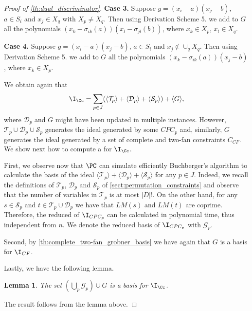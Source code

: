 \documentclass[11pt]{article}
\newtheorem{lemma}[theorem]{Lemma}
\begin{document}
\begin{proof} [Proof of \cref{th:dual_discriminator}]
\textbf{Case 3.} Suppose $ g = (x_i - a)(x_j - b)$, $a \in S_i$ and $x_j \in X_q$ with $X_p \neq X_q$. Then using Derivation Scheme 5. we add to $G$ all the polynomials $(x_k - \sigma_{ik}(a))(x_l - \sigma_{jl}(b))$, where $x_k \in X_p$, $x_l \in X_q$.

\textbf{Case 4.} Suppose $g = (x_i - a)(x_j - b)$, $a \in S_i$ and $x_j \notin \cup_q X_q$. Then using Derivation Scheme 5. we add to $G$ all the polynomials $(x_k - \sigma_{ik}(a))(x_j - b)$, where $x_k \in X_p$.

We obtain again that
\begin{equation}\label{eqn:combinatorial_ideal_decomposition_2}
    \I_{\Cc} = \sum_{p \in J} (\langle \mathcal{T}_p \rangle + \langle \mathcal{D}_p \rangle + \langle \mathcal{S}_p \rangle) + \langle G \rangle,
\end{equation}
where $\mathcal{D}_p$ and $G$ might have been updated in multiple instances. However, $\mathcal{T}_p \cup \mathcal{D}_p \cup \mathcal{S}_p$ generates the ideal generated by some $CPC_p$ and, similarly, $G$ generates the ideal generated by a set of complete and two-fan constraints $C_{CF}$. We show next how to compute a \GB for $\I_\Cc$.

First, we observe now that $\PC$ can simulate efficiently Buchberger's algorithm to calculate the \GB basis of the ideal $\langle \mathcal{T}_p \rangle + \langle \mathcal{D}_p \rangle + \langle \mathcal{S}_p \rangle$ for any $p \in J$. Indeed, we recall the definitions of $\mathcal{T}_p$, $\mathcal{D}_p$ and $\mathcal{S}_p$ of \cref{sect:permutation_constraints} and observe that the number of variables in $\mathcal{T}_p$ is at most $|D|!$. On the other hand, for any $s \in \mathcal{S}_p$ and $t \in \mathcal{T}_p \cup \mathcal{D}_p$ we have that $LM(s)$ and $LM(t)$ are coprime. Therefore, the reduced \GB  of $\I_{CPC_p}$ can be calculated in polynomial time, thus independent from $n$. We denote the reduced \GB basis of $\I_{CPC_p}$ with $\mathcal{G}_p$.

Second, by \cref{th:complete_two-fan_grobner_basis} we have again that $G$ is a \GB basis for $\I_{CF}$.

Lastly, we have the following lemma.

\begin{lemma}\cite{BharathiM21, BharathiM25}
    The set $\left( \bigcup_p \mathcal{G}_p \right) \cup G$ is a \GB basis for $\I_\Cc$.
\end{lemma}

The result follows from the lemma above.

\end{proof}
\end{document}
